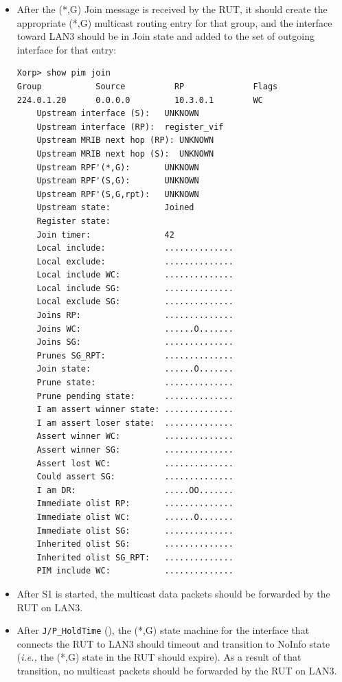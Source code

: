 \documentclass[11pt]{report}
\newcommand{\ie}{\emph{i.e.,}\xspace}
\begin{document}
\begin{itemize}

  \item After the (*,G) Join message is received by the RUT, it
  should create the appropriate (*,G) multicast routing entry for
  that group, and the interface toward LAN3 should be in Join state and
  added to the set of outgoing interface for that entry:

\begin{verbatim}
Xorp> show pim join 
Group           Source          RP              Flags
224.0.1.20      0.0.0.0         10.3.0.1        WC   
    Upstream interface (S):   UNKNOWN
    Upstream interface (RP):  register_vif
    Upstream MRIB next hop (RP): UNKNOWN
    Upstream MRIB next hop (S):  UNKNOWN
    Upstream RPF'(*,G):       UNKNOWN
    Upstream RPF'(S,G):       UNKNOWN
    Upstream RPF'(S,G,rpt):   UNKNOWN
    Upstream state:           Joined 
    Register state:           
    Join timer:               42
    Local include:            ..............
    Local exclude:            ..............
    Local include WC:         ..............
    Local include SG:         ..............
    Local exclude SG:         ..............
    Joins RP:                 ..............
    Joins WC:                 ......O.......
    Joins SG:                 ..............
    Prunes SG_RPT:            ..............
    Join state:               ......O.......
    Prune state:              ..............
    Prune pending state:      ..............
    I am assert winner state: ..............
    I am assert loser state:  ..............
    Assert winner WC:         ..............
    Assert winner SG:         ..............
    Assert lost WC:           ..............
    Could assert SG:          ..............
    I am DR:                  .....OO.......
    Immediate olist RP:       ..............
    Immediate olist WC:       ......O.......
    Immediate olist SG:       ..............
    Inherited olist SG:       ..............
    Inherited olist SG_RPT:   ..............
    PIM include WC:           ..............
\end{verbatim}

  \item After S1 is started, the multicast data packets should be
  forwarded by the RUT on LAN3.

  \item After \verb=J/P_HoldTime= ({\PimsmJPHoldTime}),
  the (*,G) state machine for the interface that connects the RUT to
  LAN3 should timeout and transition to NoInfo state
  (\ie the (*,G) state in the RUT should expire).
  As a result of that transition, no multicast packets should be
  forwarded by the RUT on LAN3.

\end{itemize}
\end{document}
